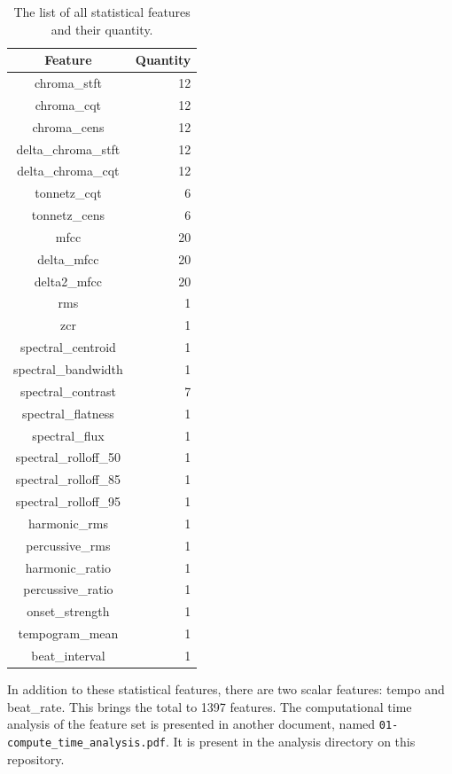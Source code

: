 \documentclass[11pt]{article}
\begin{document}
\begin{table}
  \centering
  \caption{The list of all statistical features and their quantity.}
  \label{tab:features}
  \begin{tabular}{|c|r|}
    \toprule
    Feature & Quantity \\
    \midrule
chroma\_stft & 12 \\
        chroma\_cqt & 12 \\
        chroma\_cens & 12 \\
        delta\_chroma\_stft & 12 \\
        delta\_chroma\_cqt & 12 \\
        tonnetz\_cqt & 6 \\
        tonnetz\_cens & 6 \\
        mfcc & 20 \\
        delta\_mfcc & 20 \\
        delta2\_mfcc & 20 \\
        rms & 1 \\
        zcr & 1 \\
        spectral\_centroid & 1 \\
        spectral\_bandwidth & 1 \\
        spectral\_contrast & 7 \\
        spectral\_flatness & 1 \\
        spectral\_flux & 1 \\
        spectral\_rolloff\_50 & 1 \\
        spectral\_rolloff\_85 & 1 \\
        spectral\_rolloff\_95 & 1 \\
        harmonic\_rms & 1 \\
        percussive\_rms & 1 \\
        harmonic\_ratio & 1 \\
        percussive\_ratio & 1 \\
        onset\_strength & 1 \\
        tempogram\_mean & 1 \\
    beat\_interval & 1 \\
    \bottomrule
  \end{tabular}
\end{table}

In addition to these statistical features, there are two scalar features: tempo and beat\_rate. This brings the total to 1397 features. The computational time analysis of the feature set is presented in another document, named \texttt{01-compute\_time\_analysis.pdf}. It is present in the analysis directory on this repository.
\end{document}
